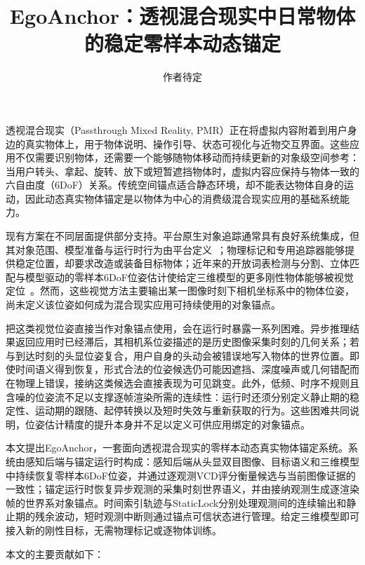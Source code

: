 \documentclass[review]{vgtc}
\title{EgoAnchor：透视混合现实中日常物体的稳定零样本动态锚定}
\author{作者待定}
\begin{document}
\label{sec:introduction}
\maketitle

透视混合现实（Passthrough Mixed Reality, PMR）正在将虚拟内容附着到用户身边的真实物体上，用于物体说明、操作引导、状态可视化与近物交互界面。这些应用不仅需要识别物体，还需要一个能够随物体移动而持续更新的对象级空间参考：当用户转头、拿起、旋转、放下或短暂遮挡物体时，虚拟内容应保持与物体一致的六自由度（6DoF）关系。传统空间锚点适合静态环境，却不能表达物体自身的运动，因此动态真实物体锚定是以物体为中心的消费级混合现实应用的基础系统能力。

现有方案在不同层面提供部分支持。平台原生对象追踪通常具有良好系统集成，但其对象范围、模型准备与运行时行为由平台定义~\cite{appleObjectAnchor,appleObjectTracking2026,azureObjectAnchors,metaDynamicObjectTracker}；物理标记和专用追踪器能够提供稳定位置，却要求改造或装备目标物体；近年来的开放词表检测与分割、立体匹配与模型驱动的零样本6DoF位姿估计使给定三维模型的更多刚性物体能够被视觉定位~\cite{foundationpose2023,megapose2022}。然而，这些视觉方法主要输出某一图像时刻下相机坐标系中的物体位姿，尚未定义该位姿如何成为混合现实应用可持续使用的对象锚点。

把这类视觉位姿直接当作对象锚点使用，会在运行时暴露一系列困难。异步推理结果返回应用时已经滞后，其相机系位姿描述的是历史图像采集时刻的几何关系；若与到达时刻的头显位姿复合，用户自身的头动会被错误地写入物体的世界位置。即使时间语义得到恢复，形式合法的位姿候选仍可能因遮挡、深度噪声或几何错配而在物理上错误，接纳这类候选会直接表现为可见跳变。此外，低频、时序不规则且含噪的位姿流不足以支撑逐帧渲染所需的连续性：运行时还须分别定义静止期的稳定性、运动期的跟随、起停转换以及短时失效与重新获取的行为。这些困难共同说明，位姿估计精度的提升本身并不足以定义可供应用绑定的对象锚点。

本文提出EgoAnchor，一套面向透视混合现实的零样本动态真实物体锚定系统。系统由感知后端与锚定运行时构成：感知后端从头显双目图像、目标语义和三维模型中持续恢复零样本6DoF位姿，并通过逐观测VCD评分衡量候选与当前图像证据的一致性；锚定运行时恢复异步观测的采集时刻世界语义，并由接纳观测生成逐渲染帧的世界系对象锚点。时间索引轨迹与StaticLock分别处理观测间的连续输出和静止期的残余波动，短时观测中断则通过锚点可信状态进行管理。给定三维模型即可接入新的刚性目标，无需物理标记或逐物体训练。

本文的主要贡献如下：
\end{document}
